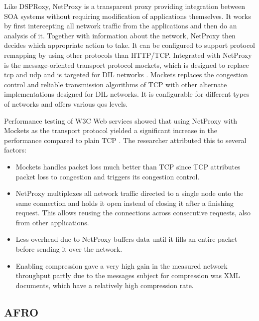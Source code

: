 Like DSPRoxy, NetProxy is a transparent proxy providing integration between SOA
systems without requiring modification of applications themselves. It works by
first intercepting all network traffic from the applications and then do an
analysis of it. Together with information about the network, NetProxy then
decides which appropriate action to take. It can be configured to support
protocol remapping by using other protocols than HTTP/TCP. Integrated with
NetProxy is the message-oriented transport protocol \gls{mockets}, which is
designed to replace \gls{tcp} and \gls{udp} and is targeted for DIL networks
\cite{suri-netproxy}. Mockets replaces the congestion control and reliable
transmission algorithms of TCP with other alternate implementations designed for
DIL networks. It is configurable for different types of networks and offers
various \gls{qos} levels.

Performance testing of W3C Web services showed that using NetProxy with Mockets as
the transport protocol yielded a significant increase in the performance
compared to plain TCP \cite{suri-netproxy}. The researcher attributed this to
several factors:

\begin{itemize}

    \item Mockets handles packet loss much better than TCP since TCP attributes
    packet loss to congestion and triggers its congestion control.

    \item NetProxy multiplexes all network traffic directed to a single node
    onto the same connection and holds it open instead of closing it after a
    finishing request. This allows reusing the connections across consecutive
    requests, also from other applications.

    \item Less overhead due to NetProxy buffers data until it fills an
    entire packet before sending it over the network.

    \item Enabling compression gave a very high gain in the measured network
    throughput partly due to the messages subject for compression was XML
    documents, which have a relatively high compression rate.

\end{itemize}

\subsection{AFRO}

